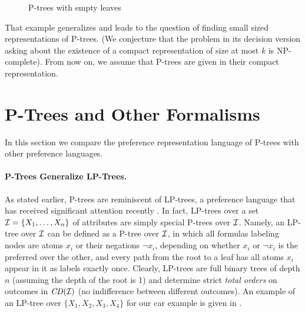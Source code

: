 \begin{figure}[!ht]
\begin{subfigure}[b]{0.2\textwidth}
	\end{subfigure}
  \caption{P-trees with empty leaves}
  \label{fig:PTree_EL}
\end{figure}

That example generalizes and leads to the question
of finding small sized representations of P-trees.
(We conjecture that the
problem in its decision version asking about the existence of a compact 
representation of size at most $k$ is NP-complete). 
From now on, we assume that P-trees are given in their compact representation. 


\section{P-Trees and Other Formalisms}

In this section we compare the preference representation language of P-trees
with other preference languages.


\paragraph{\bf P-Trees Generalize LP-Trees.}

As stated earlier, P-trees are reminiscent of LP-trees, a preference 
language that has received significant attention recently 
\cite{booth:learningLP,lang:aggLP,LiuT}. In fact, LP-trees over a set
$\mathcal{I}=\{X_1,\ldots,X_n\}$ of attributes are simply special P-trees over $\mathcal{I}$.
Namely, an LP-tree over $\mathcal{I}$ can be defined as a P-tree over $\mathcal{I}$, in
which all formulas labeling nodes are atoms $x_i$ or their negations $\neg x_i$,
depending on whether $x_i$ or $\neg x_i$ is the preferred over the other, and every path from 
the root to a leaf has all atoms $x_i$ appear in it as labels exactly 
once. Clearly, LP-trees are full binary trees of depth $n$ (assuming the depth of the root is 1) 
and determine strict \emph{total orders} on outcomes 
in $\mathit{CD}(\mathcal{I})$ (no indifference between different outcomes). An example 
of an LP-tree over $\{X_1,X_2,X_3,X_4\}$ for our car example is 
given in . 

